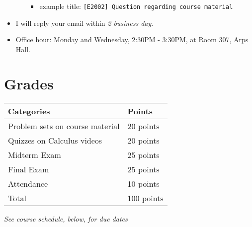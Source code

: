 \documentclass[12pt]{article}
\begin{document}
\begin{itemize}
\begin{enumerate}
        \begin{itemize}
            \item example title: \texttt{[E2002] Question regarding course material}
        \end{itemize}
    \end{enumerate}
    \item I will reply your email within \textit{2 business day}.
    \item Office hour: Monday and Wednesday, 2:30PM - 3:30PM, at Room 307, Arps Hall.
\end{itemize}

\newpage

\section*{Grades}


\newlength\q
\setlength{}
\begin{tabular}{|p{\q}|p{\q}|}
    \hline
    Categories  & Points \\
    \hline
    \hline
    Problem sets on course material   & 20 points \\
    \hline
    Quizzes on Calculus videos & 20 points \\
    \hline
    Midterm Exam & 25 points \\
    \hline
    Final Exam & 25 points \\
    \hline
    Attendance & 10 points \\
    \hline
    Total & 100 points \\
    \hline
\end{tabular}
\textit{See course schedule, below, for due dates}
\end{document}

